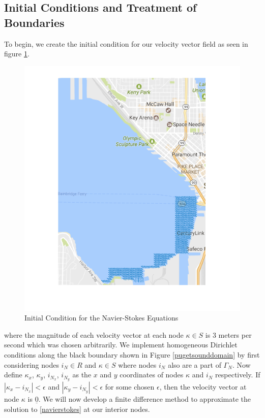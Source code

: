 \documentclass[a4paper]{article}
\newcommand\abs[1]{\left|#1\right|}
\theoremstyle{remark}
\theoremstyle{remark}
\begin{document}
\subsection{Initial Conditions and Treatment of Boundaries} \label{Navier-Stokes Initial Conditions and Boundaries Section}
To begin, we create the initial condition for our velocity vector field as seen in figure \ref{navierstokesinitialcondition}.

\begin{figure}[H]  
\centering   
   \includegraphics[width=0.4\linewidth]{initialcondnavierstokes.png}
    \caption{Initial Condition for the Navier-Stokes Equations}
    \label{navierstokesinitialcondition}
\end{figure}

\noindent where the magnitude of each velocity vector at each node $\kappa \in S$ is $3$ meters per second which was chosen arbitrarily. We implement homogeneous Dirichlet conditions along the black boundary shown in Figure \ref{pugetsounddomain} by first considering nodes $i_{N} \in R$ and $\kappa \in S$ where nodes $i_{N}$ also are a part of $\Gamma_{N}$. Now define $\kappa_{x}$, $\kappa_{y}$, $i_{N_{x}}$, $i_{N_{y}}$ as the $x$ and $y$ coordinates of nodes $\kappa$ and $i_{N}$ respectively. If $\abs{\kappa_{x} - i_{N_{x}}} < \epsilon$ and $\abs{\kappa_{y} - i_{N_{y}}} < \epsilon$ for some chosen $\epsilon$, then the velocity vector at node $\kappa$ is $\underline{0}$. We will now develop a finite difference method to approximate the solution to \eqref{navierstokes} at our interior nodes.
\end{document}
